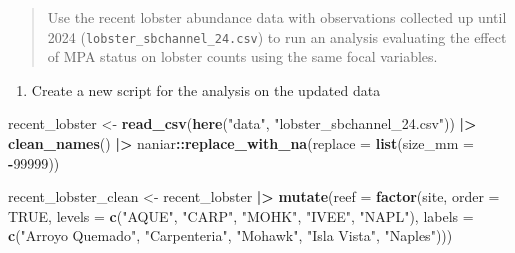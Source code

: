 \documentclass[
]{article}
\newenvironment{Shaded}{\begin{snugshade}}{\end{snugshade}}
\newcommand{\AttributeTok}[1]{\textcolor[rgb]{0.13,0.29,0.53}{#1}}
\newcommand{\ConstantTok}[1]{\textcolor[rgb]{0.56,0.35,0.01}{#1}}
\newcommand{\DecValTok}[1]{\textcolor[rgb]{0.00,0.00,0.81}{#1}}
\newcommand{\FunctionTok}[1]{\textcolor[rgb]{0.13,0.29,0.53}{\textbf{#1}}}
\newcommand{\NormalTok}[1]{#1}
\newcommand{\OtherTok}[1]{\textcolor[rgb]{0.56,0.35,0.01}{#1}}
\newcommand{\SpecialCharTok}[1]{\textcolor[rgb]{0.81,0.36,0.00}{\textbf{#1}}}
\newcommand{\StringTok}[1]{\textcolor[rgb]{0.31,0.60,0.02}{#1}}
\providecommand{\tightlist}{%
  \setlength{\itemsep}{0pt}\setlength{\parskip}{0pt}}
\begin{document}
\begin{quote}
Use the recent lobster abundance data with observations collected up
until 2024 (\texttt{lobster\_sbchannel\_24.csv}) to run an analysis
evaluating the effect of MPA status on lobster counts using the same
focal variables.
\end{quote}

\begin{enumerate}
\def\labelenumi{\alph{enumi}.}
\tightlist
\item
  Create a new script for the analysis on the updated data
\end{enumerate}

\begin{Shaded}
\begin{Highlighting}[]
\NormalTok{recent\_lobster }\OtherTok{\textless{}{-}} \FunctionTok{read\_csv}\NormalTok{(}\FunctionTok{here}\NormalTok{(}\StringTok{"data"}\NormalTok{, }\StringTok{"lobster\_sbchannel\_24.csv"}\NormalTok{)) }\SpecialCharTok{|\textgreater{}} 
    \FunctionTok{clean\_names}\NormalTok{() }\SpecialCharTok{|\textgreater{}} 
\NormalTok{    naniar}\SpecialCharTok{::}\FunctionTok{replace\_with\_na}\NormalTok{(}\AttributeTok{replace =} \FunctionTok{list}\NormalTok{(}\AttributeTok{size\_mm =} \SpecialCharTok{{-}}\DecValTok{99999}\NormalTok{))}
\end{Highlighting}
\end{Shaded}

\begin{Shaded}
\begin{Highlighting}[]
\NormalTok{recent\_lobster\_clean }\OtherTok{\textless{}{-}}\NormalTok{ recent\_lobster }\SpecialCharTok{|\textgreater{}}    
    \FunctionTok{mutate}\NormalTok{(}\AttributeTok{reef =} \FunctionTok{factor}\NormalTok{(site, }\AttributeTok{order =} \ConstantTok{TRUE}\NormalTok{, }\AttributeTok{levels =} \FunctionTok{c}\NormalTok{(}\StringTok{"AQUE"}\NormalTok{, }\StringTok{"CARP"}\NormalTok{, }\StringTok{"MOHK"}\NormalTok{, }\StringTok{"IVEE"}\NormalTok{, }\StringTok{"NAPL"}\NormalTok{), }\AttributeTok{labels =} \FunctionTok{c}\NormalTok{(}\StringTok{"Arroyo Quemado"}\NormalTok{, }\StringTok{"Carpenteria"}\NormalTok{, }\StringTok{"Mohawk"}\NormalTok{, }\StringTok{"Isla Vista"}\NormalTok{,  }\StringTok{"Naples"}\NormalTok{))) }
\end{Highlighting}
\end{Shaded}
\end{document}
